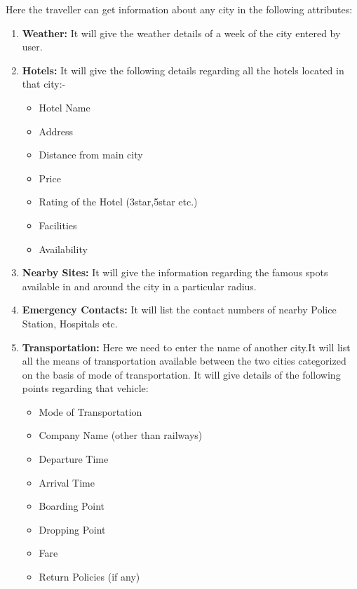 \documentclass{article}
\begin{document}
Here the traveller can get information about any city in the following attributes:
\begin{enumerate}
    \item \textbf{Weather:}
    It will give the weather details of a week of the city entered by user. 
    \item \textbf{Hotels:}
    It will give the following details regarding all the hotels located in that city:-
    \begin{itemize}
        \item Hotel Name
        \item Address
        \item Distance from main city
        \item Price
        \item Rating of the Hotel (3star,5star etc.)
        \item Facilities
        \item Availability
    \end{itemize}
    \item \textbf{Nearby Sites:}
    It will give the information regarding the famous spots available in and around the city in a particular radius.
    \item \textbf{Emergency Contacts:}
    It will list the contact numbers of nearby Police Station, Hospitals etc.
    \item \textbf{Transportation:}
    Here we need to enter the name of another city.It will list all the means of transportation available between the two cities categorized on the basis of mode of transportation. It will give details of the following points regarding that vehicle:
    \begin{itemize}
        \item Mode of Transportation
        \item Company Name (other than railways)
        \item Departure Time
        \item Arrival Time
        \item Boarding Point
        \item Dropping Point
        \item Fare
        \item Return Policies (if any)
    \end{itemize}
    
\end{enumerate}
\end{document}
